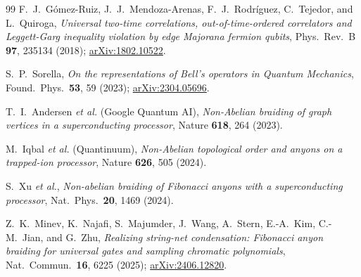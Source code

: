 \documentclass[aps,prx,reprint,amsmath,amssymb,floatfix,nofootinbib,superscriptaddress]{revtex4-2}
\begin{document}
\begin{thebibliography}{99}
F.~J.~G\'omez-Ruiz, J.~J.~Mendoza-Arenas, F.~J.~Rodr\'iguez,
C.~Tejedor, and L.~Quiroga,
\emph{Universal two-time correlations, out-of-time-ordered
correlators and Leggett-Garg inequality violation by edge Majorana
fermion qubits},
Phys.\ Rev.\ B \textbf{97}, 235134 (2018);
\href{https://arxiv.org/abs/1802.10522}{arXiv:1802.10522}.

S.~P.~Sorella,
\emph{On the representations of Bell's operators in Quantum Mechanics},
Found.\ Phys.\ \textbf{53}, 59 (2023);
\href{https://arxiv.org/abs/2304.05696}{arXiv:2304.05696}.

T.~I.~Andersen \emph{et al.} (Google Quantum AI),
\emph{Non-Abelian braiding of graph vertices in a superconducting processor},
Nature \textbf{618}, 264 (2023).

M.~Iqbal \emph{et al.} (Quantinuum),
\emph{Non-Abelian topological order and anyons on a trapped-ion processor},
Nature \textbf{626}, 505 (2024).

S.~Xu \emph{et al.},
\emph{Non-abelian braiding of Fibonacci anyons with a superconducting processor},
Nat.\ Phys.\ \textbf{20}, 1469 (2024).

Z.~K.~Minev, K.~Najafi, S.~Majumder, J.~Wang, A.~Stern,
E.-A.~Kim, C.-M.~Jian, and G.~Zhu,
\emph{Realizing string-net condensation: Fibonacci anyon braiding
for universal gates and sampling chromatic polynomials},
Nat.\ Commun.\ \textbf{16}, 6225 (2025);
\href{https://arxiv.org/abs/2406.12820}{arXiv:2406.12820}.

\end{thebibliography}
\end{document}
